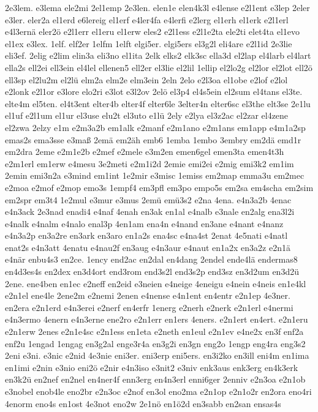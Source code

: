 {2e3lem.
e3lema
ele2mi
2el1emp
2e3len.
elen1e
elen4k3l
e4lense
e2l1ent
e3lep
2eler
e3ler.
eler2a
el1erd
e6lereig
el1erf
e4ler4fa
e4lerfi
e2lerg
el1erh
el1erk
e2l1erl
e4l3ernä
eler2ö
e2l1err
el1eru
el1erw
eles2
e2l1ess
e2l1e2ta
ele2ti
elet4ta
el1evo
el1ex
e3lex.
1elf.
elf2er
1elfm
1elft
elgi5er.
elgi5ers
el3g2l
eli4are
e2l1id
2e3lie
eli3ef.
2elig
e2lim
elin3a
eli3no
el1ita
2elk
elks2
elk3sc
ella3d
el2lap
el4larb
el4lart
ella2s
ell2ei
ell3ein
el4lel
ellenen5
ell2er
el3lie
el2lil
1ellip
el2lo2g
el2lor
el2lot
ell2ö
ell3sp
el2lu2m
el2lü
elm2a
elm2e
elm3ein
2eln
2elo
e2l3oa
el1obe
e2lof
e2lol
e2lonk
e2l1or
e3lore
elo2ri
e3lot
e3l2ov
2elö
el3p4
el4s5ein
el2sum
el4tans
el3te.
elte4m
el5ten.
el4t3ent
elter4b
elter4f
elter6le
3elter4n
elter6sc
el3the
elt3se
2e1lu
el1uf
e2l1um
el1ur
el3use
elu2t
el3uto
e1lü
2ely
e2lya
el3z2ac
el2zar
el4zene
el2zwa
2elzy
e1m
e2m3a2b
em1alk
e2manf
e2m1ano
e2m1ans
em1app
e4m1a2sp
emas2s
ema3sse
e3maß
2emä
em2äh
emb6
1emba
1embo
3embry
em2dä
emd1r
em2dra
2eme
e2m1e2b
e2mef
e2mele
e3m2en
emen6gel
emen3ta
emen4t3h
e2m1erl
em1erw
e4mesu
3e2meti
e2m1i2d
2emie
emi2ei
e2mig
emi3k2
em1im
2emin
emi3n2a
e3mind
em1int
1e2mir
e3misc
1emiss
em2map
emma3u
em2mec
e2moa
e2mof
e2mop
emo3s
1empf4
em3pfl
em3po
empo5s
em2sa
em4scha
em2sim
em2spr
em3t4
1e2mul
e3mur
e3mus
2emü
emü3s2
e2na
4ena.
e4n3a2b
4enac
e4n3ack
2e3nad
enadi4
e4naf
4enah
en3ak
en1al
e4nalb
e3nale
en2alg
ena3l2i
e4nalk
e4nalm
e4nalo
enal3p
4en1am
ena4n
e4nand
en3ane
e4nant
e4nanz
e4n3a2p
en3a2re
en3ark
en3aro
en1a2s
ena4sc
e4na4st
2enat
4e5nati
e4natl
enat2s
e4n3att
4enatu
e4nau2f
en3aug
e4n3aur
e4naut
en1a2x
en3a2z
e2n1ä
e4när
enbu4s3
en2ce.
1ency
end2ac
en2dal
en4dang
2endel
ende4lä
endermas8
en4d3es4s
en2dex
en3d4ort
end3rom
end3s2l
end3s2p
end3sz
en3d2um
en3d2ü
2ene.
ene4ben
en1ec
e2neff
en2eid
e3neien
e4neige
4eneigu
e4nein
e4neis
en1e4kl
e2n1el
ene4le
2ene2m
e2nemi
2enen
e4nense
e4n1ent
en4entr
e2n1ep
4e3ner.
en2era
e2n1erd
e4n3erei
e2nerf
en4erfr
1energ
e2nerh
e2nerk
e2n1erl
e4nermi
e4n3ermo
4enern
e4n3erne
ene2ro
e2n1err
en1ers
4eners.
e2n1ert
en4ert.
e2n1eru
e2n1erw
2enes
e2n1e4sc
e2n1ess
en1eta
e2neth
en1eul
e2n1ev
e4ne2x
en3f
enf2a
enf2u
1engad
1engag
en3g2al
enge3r4a
en3g2i
en3gn
eng2o
1engp
eng4ra
eng3s2
2eni
e3ni.
e3nic
e2nid
4e3nie
eni3er.
eni3erp
eni5ers.
en3i2ko
en3ill
eni4m
en1ima
en1imi
e2nin
e3nio
eni2ö
e2nir
e4n3iso
e3nit2
e3niv
enk3aus
enk3erg
en4k3erk
en3k2ü
en2nef
en2nel
en4ner4f
enn3erg
en4n3erl
enni6ger
2enniv
e2n3oa
e2n1ob
e3nobel
enob4le
eno2br
e2n3oc
e2nof
en3ol
eno2ma
e2n1op
e2n1o2r
en2ora
eno4ri
4enorm
eno4s
en1ost
4e3not
eno2w
2e1nö
en1ö2d
en3sabb
en2san
ensas4s
}
